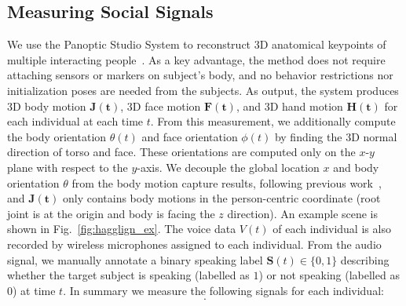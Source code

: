 \subsection{Measuring Social Signals}
We use the Panoptic Studio System to reconstruct 3D anatomical keypoints of multiple interacting people~\cite{joo2017panoptic, joo2018}. As a key advantage, the method does not require attaching sensors or markers on subject's body, and no behavior restrictions nor initialization poses are needed from the subjects. As output, the system produces 3D body motion $\mathbf{J(t)}$, 3D face motion $\mathbf{F(t)}$, and 3D hand motion $\mathbf{H(t)}$ for each individual at each time $t$. From this measurement, we additionally compute the body orientation $\theta(t)$ and face orientation $\phi(t)$ by finding the 3D normal direction of torso and face. These orientations are computed only on the $x$-$y$ plane with respect to the $y$-axis. We decouple the global location $x$ and body orientation $\theta$ from the body motion capture results, following previous work~\cite{jain2016structural, holden2016deep}, and $\mathbf{J(t)}$ only contains body motions in the person-centric coordinate (root joint is at the origin and body is facing the $z$ direction). An example scene is shown in Fig.~\ref{fig:hagglign_ex}. The voice data $V(t)$ of each individual is also recorded by wireless microphones assigned to each individual. From the audio signal, we manually annotate a binary speaking label $\mathbf{S}(t) \in \{0,1\}$ describing whether the target subject is speaking (labelled as $1$) or not speaking (labelled as $0$) at time $t$. In summary we measure the following signals for each individual:
\begin{equation}
[ \mathbf{x}, \mathbf{\theta}, \mathbf{\phi}, \mathbf{J}, \mathbf{F}, \mathbf{H}, \mathbf{V}, \mathbf{S} ].
\label{equation:measurement}
\end{equation}




